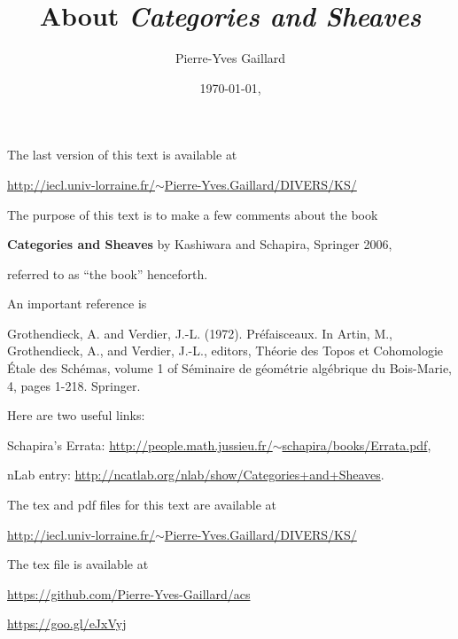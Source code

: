 \documentclass[12pt]{article}
\title{About \em{Categories and Sheaves}}
\author{Pierre-Yves Gaillard}
\date{\today, \currenttime}
\theoremstyle{remark}
\theoremstyle{definition}
\begin{document}
\maketitle

\nn The last version of this text is available at

\nn\href{http://iecl.univ-lorraine.fr/~Pierre-Yves.Gaillard/DIVERS/KS/}{http://iecl.univ-lorraine.fr/$\sim$Pierre-Yves.Gaillard/DIVERS/KS/}

\tableofcontents\newpage

\nn The purpose of this text is to make a few comments about the book 

\textbf{Categories and Sheaves} by Kashiwara and Schapira, Springer 2006, 

\nn referred to as ``the book'' henceforth. 

An important reference is

\nn[GV] Grothendieck, A. and Verdier, J.-L. (1972). Préfaisceaux. In Artin, M., Grothendieck, A., and Verdier, J.-L., editors, Théorie des Topos et Cohomologie Étale des Schémas, volume 1 of Séminaire de géométrie algébrique du Bois-Marie, 4, pages 1-218. Springer. 


Here are two useful links:

\nn Schapira's Errata: \href{http://people.math.jussieu.fr/~schapira/books/Errata.pdf}{http://people.math.jussieu.fr/$\sim$schapira/books/Errata.pdf},

\nn nLab entry: \href{http://ncatlab.org/nlab/show/Categories+and+Sheaves}{http://ncatlab.org/nlab/show/Categories+and+Sheaves}. 

The tex and pdf files for this text are available at
 
\nn\href{http://iecl.univ-lorraine.fr/~Pierre-Yves.Gaillard/DIVERS/KS/}{http://iecl.univ-lorraine.fr/$\sim$Pierre-Yves.Gaillard/DIVERS/KS/}

The tex file is available at

\nn\href{https://github.com/Pierre-Yves-Gaillard/acs}{https://github.com/Pierre-Yves-Gaillard/acs}

\nn\href{https://goo.gl/eJxVyj}{https://goo.gl/eJxVyj}


\end{document}
